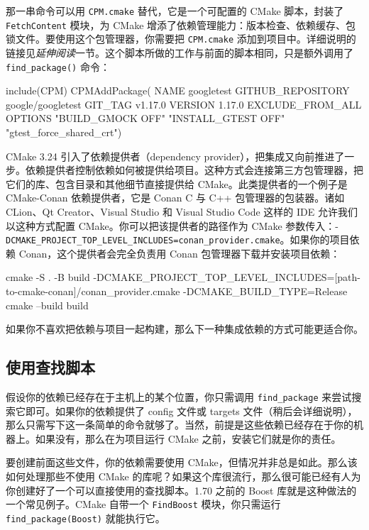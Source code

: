 那一串命令可以用 \texttt{CPM.cmake} 替代，它是一个可配置的 CMake 脚本，封装了 \texttt{Fetch\allowbreak{}Content} 模块，为 CMake 增添了依赖管理能力：版本检查、依赖缓存、包锁文件。要使用这个包管理器，你需要把 \texttt{CPM.cmake} 添加到项目中。详细说明的链接见\emph{延伸阅读}一节。这个脚本所做的工作与前面的脚本相同，只是额外调用了 \texttt{find\_\allowbreak{}package(\allowbreak{})\allowbreak{}} 命令：

\begin{codebox}[cmake]
include(CPM)
CPMAddPackage(
  NAME googletest
  GITHUB_REPOSITORY google/googletest
  GIT_TAG v1.17.0
  VERSION 1.17.0
  EXCLUDE_FROM_ALL
  OPTIONS "BUILD_GMOCK OFF" "INSTALL_GTEST OFF" "gtest_force_shared_crt")
\end{codebox}

CMake 3.24 引入了依赖提供者（dependency provider），把集成又向前推进了一步。依赖提供者控制依赖如何被提供给项目。这种方式会连接第三方包管理器，把它们的库、包含目录和其他细节直接提供给 CMake。此类提供者的一个例子是 CMake-Conan 依赖提供者，它是 Conan C 与 C++ 包管理器的包装器。诸如 CLion、Qt Creator、Visual Studio 和 Visual Studio Code 这样的 IDE 允许我们以这种方式配置 CMake。你可以把该提供者的路径作为 CMake 参数传入：-\texttt{DCMAKE\_\allowbreak{}PROJECT\_\allowbreak{}TOP\_\allowbreak{}LEVEL\_\allowbreak{}INCLUDES=\allowbreak{}conan\_\allowbreak{}provider.\allowbreak{}cmake}。如果你的项目依赖 Conan，这个提供者会完全负责用 Conan 包管理器下载并安装项目依赖：

\begin{codebox}[text]
cmake -S . -B build -DCMAKE_PROJECT_TOP_LEVEL_INCLUDES=[path-to-cmake-conan]/conan_provider.cmake -DCMAKE_BUILD_TYPE=Release
cmake --build build
\end{codebox}

\label{idx:680}
\label{idx:681}
如果你不喜欢把依赖与项目一起构建，那么下一种集成依赖的方式可能更适合你。

\subsection{使用查找脚本}

\label{idx:682}
\label{idx:683}
假设你的依赖已经存在于主机上的某个位置，你只需调用 \texttt{find\_\allowbreak{}package} 来尝试搜索它即可。如果你的依赖提供了 config 文件或 targets 文件（稍后会详细说明），那么只需写下这一条简单的命令就够了。当然，前提是这些依赖已经存在于你的机器上。如果没有，那么在为项目运行 CMake 之前，安装它们就是你的责任。

要创建前面这些文件，你的依赖需要使用 CMake，但情况并非总是如此。那么该如何处理那些不使用 CMake 的库呢？如果这个库很流行，那么很可能已经有人为你创建好了一个可以直接使用的查找脚本。1.70 之前的 Boost 库就是这种做法的一个常见例子。CMake 自带一个 \texttt{FindBoost} 模块，你只需运行 \texttt{find\_\allowbreak{}package(\allowbreak{}Boost)\allowbreak{}} 就能执行它。

